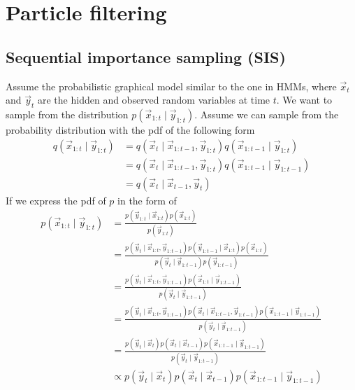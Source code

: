 \section{Particle filtering}
\subsection{Sequential importance sampling (SIS)}
    Assume the probabilistic graphical model similar to the one in HMMs, where $\vec x_t$ and $\vec y_t$ are the hidden and observed random variables at time $t$. We want to sample from the distribution $p(\vec x_{1:t} \mid \vec y_{1:t})$. Assume we can sample from the probability distribution with the pdf of the following form
    \begin{align}
        q(\vec x_{1:t} \mid \vec y_{1:t})   &= q(\vec x_t \mid \vec x_{1:t - 1}, \vec y_{1:t}) q(\vec x_{1:t-1} \mid \vec y_{1:t}) \\
                                            &= q(\vec x_t \mid \vec x_{1:t - 1}, \vec y_{1:t}) q(\vec x_{1:t-1} \mid \vec y_{1:t - 1}) \\
                                            &= q(\vec x_t \mid \vec x_{t - 1}, \vec y_t)
    \end{align}
    If we express the pdf of $p$ in the form of
    \begin{align}
        p(\vec x_{1:t} \mid \vec y_{1:t})   &= \frac{p(\vec y_{1:t} \mid \vec x_{1:t}) p(\vec x_{1:t})}{p(\vec y_{1:t})} \\
                                            &= \frac{p(\vec y_t \mid \vec x_{1:t}, \vec y_{1:t - 1}) p(\vec y_{1:t - 1} \mid \vec x_{1:t}) p(\vec x_{1:t})}{p(\vec y_t \mid \vec y_{1:t - 1}) p(\vec y_{1:t - 1})} \\
                                            &= \frac{p(\vec y_t \mid \vec x_{1:t}, \vec y_{1:t - 1}) p(\vec x_{1:t} \mid \vec y_{1:t - 1})}{p(\vec y_t \mid \vec y_{1:t - 1})} \\
                                            &= \frac{p(\vec y_t \mid \vec x_{1:t}, \vec y_{1:t - 1}) p(\vec x_t \mid \vec x_{1:t - 1}, \vec y_{1:t - 1}) p(\vec x_{1:t - 1} \mid \vec y_{1:t - 1})}{p(\vec y_t \mid \vec y_{1:t - 1})} \\
                                            &= \frac{p(\vec y_t \mid \vec x_t) p(\vec x_t \mid \vec x_{t - 1}) p(\vec x_{1:t - 1} \mid \vec y_{1:t - 1})}{p(\vec y_t \mid \vec y_{1:t - 1})} \\
                                            &\propto p(\vec y_t \mid \vec x_t) p(\vec x_t \mid \vec x_{t - 1}) p(\vec x_{1:t - 1} \mid \vec y_{1:t - 1})
    \end{align}
